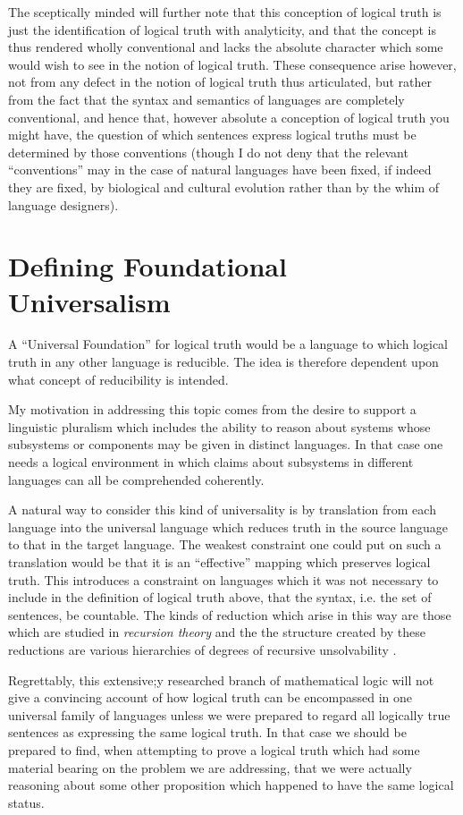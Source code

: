 \documentclass[10pt,titlepage]{book}
\begin{document}
The sceptically minded will further note that this conception of logical truth is just the identification of logical truth with analyticity, and that the concept is thus rendered wholly conventional and lacks the absolute character which some would wish to see in the notion of logical truth.
These consequence arise however, not from any defect in the notion of logical truth thus articulated, but rather from the fact that the syntax and semantics of languages are completely conventional, and hence that, however absolute a conception of logical truth you might have, the question of which sentences express logical truths must be determined by those conventions (though I do not deny that the relevant ``conventions'' may in the case of natural languages have been fixed, if indeed they are fixed, by biological and cultural evolution rather than by the whim of language designers).

\section{Defining Foundational Universalism}

A ``Universal Foundation'' for logical truth would be a language to which logical truth in any other language is reducible.
The idea is therefore dependent upon what concept of reducibility is intended.

My motivation in addressing this topic comes from the desire to support a linguistic pluralism which includes the ability to reason about systems whose subsystems or components may be given in distinct languages.
In that case one needs a logical environment in which claims about subsystems in different languages can all be comprehended coherently.

A natural way to consider this kind of universality is by translation from each language into the universal language  which reduces truth in the source language to that in the target language.
The weakest constraint one could put on such a translation would be that it is an ``effective'' mapping which preserves logical truth.
This introduces a constraint on languages which it was not necessary to include in the definition of logical truth above, that the syntax, i.e. the set of sentences, be countable.
The kinds of reduction which arise in this way are those which are studied in \emph{recursion theory} and the the structure created by these reductions are various hierarchies of degrees of recursive unsolvability \cite{rogers1967theory}.

Regrettably, this extensive;y researched branch of mathematical logic will not give a convincing account of how logical truth can be encompassed in one universal family of languages unless we were prepared to regard all logically true sentences as expressing the same logical truth.
In that case we should be prepared to find, when attempting to prove a logical truth which had some material bearing on the problem we are addressing, that we were actually reasoning about some other proposition which happened to have the same logical status.
\end{document}
